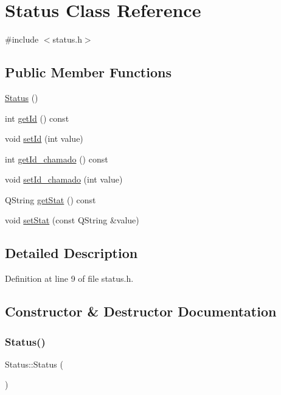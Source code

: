 \hypertarget{class_status}{}\section{Status Class Reference}
\label{class_status}


{\ttfamily \#include $<$status.\+h$>$}

\subsection*{Public Member Functions}
\begin{DoxyCompactItemize}
\item 
\hyperlink{class_status_a944586fb328a3524805748c8f7b17f32}{Status} ()
\item 
int \hyperlink{class_status_adb9c28d4221d9e2aaf9875b80b5eeaaf}{get\+Id} () const
\item 
void \hyperlink{class_status_ac2f0322cbfc1326c117eb2b244600d67}{set\+Id} (int value)
\item 
int \hyperlink{class_status_a9c4b616186e22599d7a6ce48ec724e3c}{get\+Id\+\_\+chamado} () const
\item 
void \hyperlink{class_status_aca91a7dbe10715ce9696f4b0252546ac}{set\+Id\+\_\+chamado} (int value)
\item 
Q\+String \hyperlink{class_status_a5be3ea6f3dd893039eb1278ba89d19bd}{get\+Stat} () const
\item 
void \hyperlink{class_status_aa0507ec449fc02cccb63293fed3232a4}{set\+Stat} (const Q\+String \&value)
\end{DoxyCompactItemize}


\subsection{Detailed Description}


Definition at line 9 of file status.\+h.



\subsection{Constructor \& Destructor Documentation}
\hypertarget{class_status_a944586fb328a3524805748c8f7b17f32}{}\label{class_status_a944586fb328a3524805748c8f7b17f32} 
\subsubsection{\texorpdfstring{Status()}{Status()}}
{\footnotesize\ttfamily Status\+::\+Status (\begin{DoxyParamCaption}{ }\end{DoxyParamCaption})}



